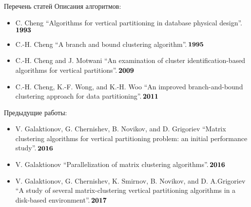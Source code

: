 \documentclass[10pt, dvipsnames]{beamer}
\begin{document}
\begin{frame}{Перечень статей}
Описания алгоритмов:	
	\begin{itemize}
	\item C. Cheng “Algorithms for vertical partitioning in database physical design”.\,$\bold{1993}$
	\item C.-H. Cheng “A branch and bound clustering algorithm”.\,$\bold{1995}$
	\item C.-H. Cheng and J. Motwani “An examination of cluster
identification-based algorithms for vertical partitions”.\,$\bold{2009}$
	\item C.-H. Cheng, K.-F. Wong, and K.-H. Woo “An improved branch-and-bound clustering approach for data partitioning”.\,$\bold{2011}$
	\end{itemize}
	
Предыдущие работы:
	\begin{itemize}
	\item V. Galaktionov, G. Chernishev, B. Novikov, and D. Grigoriev “Matrix clustering algorithms for vertical partitioning problem: an initial performance study”.\,$\bold{2016}$
	\item V. Galaktionov “Parallelization of matrix clustering algorithms”.\,$\bold{2016}$
	\item V. Galaktionov, G. Chernishev, K. Smirnov, B. Novikov, and D. A.Grigoriev “A study of several matrix-clustering vertical partitioning algorithms in a disk-based environment”.\,$\bold{2017}$
	\end{itemize}
\end{frame}
\end{document}
